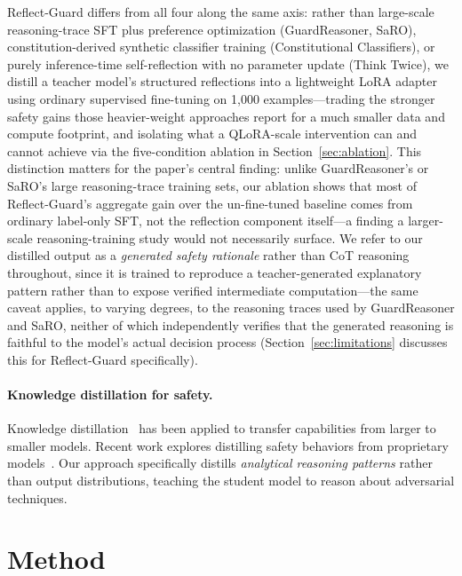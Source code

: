 \documentclass[superintelligence,article,submit,pdftex,moreauthors]{Definitions/mdpi}
\begin{document}
Reflect-Guard differs from all four along the same axis: rather than large-scale reasoning-trace SFT plus preference optimization (GuardReasoner, SaRO), constitution-derived synthetic classifier training (Constitutional Classifiers), or purely inference-time self-reflection with no parameter update (Think Twice), we distill a teacher model's structured reflections into a lightweight LoRA adapter using ordinary supervised fine-tuning on 1{,}000 examples---trading the stronger safety gains those heavier-weight approaches report for a much smaller data and compute footprint, and isolating what a QLoRA-scale intervention can and cannot achieve via the five-condition ablation in Section~\ref{sec:ablation}. This distinction matters for the paper's central finding: unlike GuardReasoner's or SaRO's large reasoning-trace training sets, our ablation shows that most of Reflect-Guard's aggregate gain over the un-fine-tuned baseline comes from ordinary label-only SFT, not the reflection component itself---a finding a larger-scale reasoning-training study would not necessarily surface. We refer to our distilled output as a \emph{generated safety rationale} rather than CoT reasoning throughout, since it is trained to reproduce a teacher-generated explanatory pattern rather than to expose verified intermediate computation---the same caveat applies, to varying degrees, to the reasoning traces used by GuardReasoner and SaRO, neither of which independently verifies that the generated reasoning is faithful to the model's actual decision process (Section~\ref{sec:limitations} discusses this for Reflect-Guard specifically).

\paragraph{Knowledge distillation for safety.}
Knowledge distillation~\citep{hinton2015distilling} has been applied to transfer capabilities from larger to smaller models. Recent work explores distilling safety behaviors from proprietary models~\citep{tunstall2023zephyr}. Our approach specifically distills \emph{analytical reasoning patterns} rather than output distributions, teaching the student model to reason about adversarial techniques.

\section{Method}
\label{sec:method}
\end{document}
